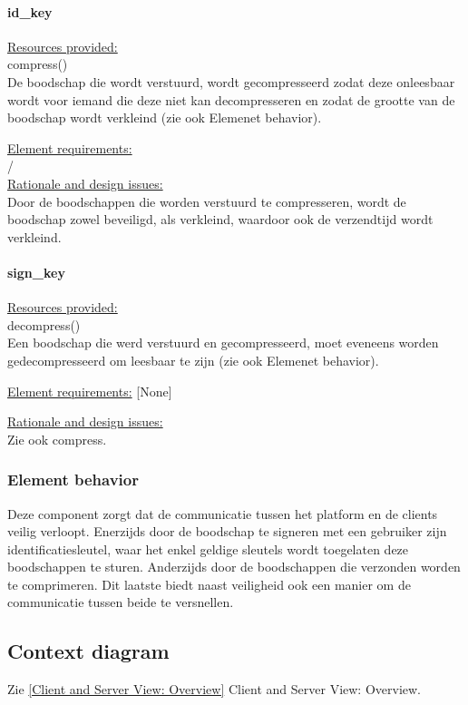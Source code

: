 \documentclass[a4paper,10pt]{article}
\begin{document}
\paragraph{id_key}

\underline{Resources provided:}\\
compress()\\
De boodschap die wordt verstuurd, wordt gecompresseerd zodat deze onleesbaar wordt voor iemand die deze niet kan decompresseren en zodat de grootte van de boodschap wordt verkleind  (zie ook Elemenet behavior).

\underline{Element requirements:}\\
/\\

\underline{Rationale and design issues:}\\
Door de boodschappen die worden verstuurd te compresseren, wordt de boodschap zowel beveiligd, als verkleind, waardoor ook de verzendtijd wordt verkleind.\\

\paragraph{sign_key}

\underline{Resources provided:}\\
decompress()\\
Een boodschap die werd verstuurd en gecompresseerd, moet eveneens worden gedecompresseerd om leesbaar te zijn (zie ook Elemenet behavior).

\underline{Element requirements:}
[None]

\underline{Rationale and design issues:}\\
Zie ook compress.\\

\subsubsection{Element behavior}
Deze component zorgt dat de communicatie tussen het platform en de clients veilig verloopt. Enerzijds door de boodschap te signeren met een gebruiker zijn identificatiesleutel, waar het enkel geldige sleutels wordt toegelaten deze boodschappen te sturen. Anderzijds door de boodschappen die verzonden worden te comprimeren. Dit laatste biedt naast veiligheid ook een manier om de communicatie tussen beide te versnellen.\\

\subsection{Context diagram}
Zie \ref{Client and Server View: Overview} Client and Server View: Overview.
\end{document}
